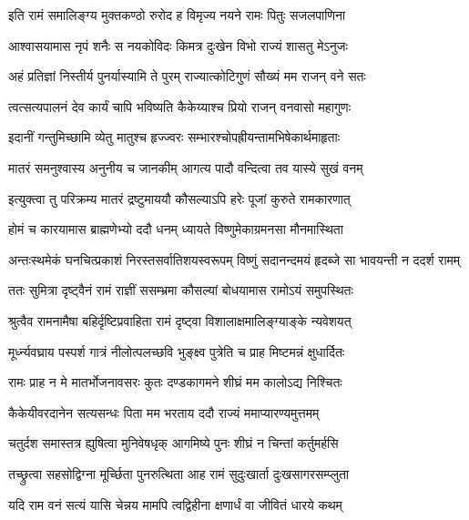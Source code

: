 \twolineshloka
{इति रामं समालिङ्ग्य मुक्तकण्ठो रुरोद ह}
{विमृज्य नयने रामः पितुः सजलपाणिना} %

\twolineshloka
{आश्वासयामास नृपं शनैः स नयकोविदः}
{किमत्र दुःखेन विभो राज्यं शासतु मेऽनुजः} %

\twolineshloka
{अहं प्रतिज्ञां निस्तीर्य पुनर्यास्यामि ते पुरम्}
{राज्यात्कोटिगुणं सौख्यं मम राजन् वने सतः} %

\twolineshloka
{त्वत्सत्यपालनं देव कार्यं चापि भविष्यति}
{कैकेय्याश्च प्रियो राजन् वनवासो महागुणः} %

\twolineshloka
{इदानीं गन्तुमिच्छामि व्येतु मातुश्च हृज्ज्वरः}
{सम्भारश्चोपह्रीयन्तामभिषेकार्थमाहृताः} %

\twolineshloka
{मातरं समनुश्वास्य अनुनीय च जानकीम्}
{आगत्य पादौ वन्दित्वा तव यास्ये सुखं वनम्} %

\twolineshloka
{इत्युक्त्वा तु परिक्रम्य मातरं द्रष्टुमाययौ}
{कौसल्याऽपि हरेः पूजां कुरुते रामकारणात्} %

\twolineshloka
{होमं च कारयामास ब्राह्मणेभ्यो ददौ धनम्}
{ध्यायते विष्णुमेकाग्रमनसा मौनमास्थिता} %

\fourlineindentedshloka
{अन्तःस्थमेकं घनचित्प्रकाशं}
{निरस्तसर्वातिशयस्वरूपम्}
{विष्णुं सदानन्दमयं हृदब्जे}
{सा भावयन्ती न ददर्श रामम्} %





\twolineshloka
{ततः सुमित्रा दृष्ट्वैनं रामं राज्ञीं ससम्भ्रमा}
{कौसल्यां बोधयामास रामोऽयं समुपस्थितः} %

\twolineshloka
{श्रुत्वैव रामनामैषा बहिर्दृष्टिप्रवाहिता}
{रामं दृष्ट्वा विशालाक्षमालिङ्ग्याङ्के न्यवेशयत्} %

\twolineshloka
{मूर्ध्न्यवघ्राय पस्पर्श गात्रं नीलोत्पलच्छवि}
{भुङ्क्ष्व पुत्रेति च प्राह मिष्टमन्नं क्षुधार्दितः} %

\twolineshloka
{रामः प्राह न मे मातर्भोजनावसरः कुतः}
{दण्डकागमने शीघ्रं मम कालोऽद्य निश्चितः} %

\twolineshloka
{कैकेयीवरदानेन सत्यसन्धः पिता मम}
{भरताय ददौ राज्यं ममाप्यारण्यमुत्तमम्} %

\twolineshloka
{चतुर्दश समास्तत्र ह्युषित्वा मुनिवेषधृक्}
{आगमिष्ये पुनः शीघ्रं न चिन्तां कर्तुमर्हसि} %

\twolineshloka
{तच्छ्रुत्वा सहसोद्विग्ना मूर्च्छिता पुनरुत्थिता}
{आह रामं सुदुःखार्ता दुःखसागरसम्प्लुता} %

\twolineshloka
{यदि राम वनं सत्यं यासि चेन्नय मामपि}
{त्वद्विहीना क्षणार्धं वा जीवितं धारये कथम्} %

